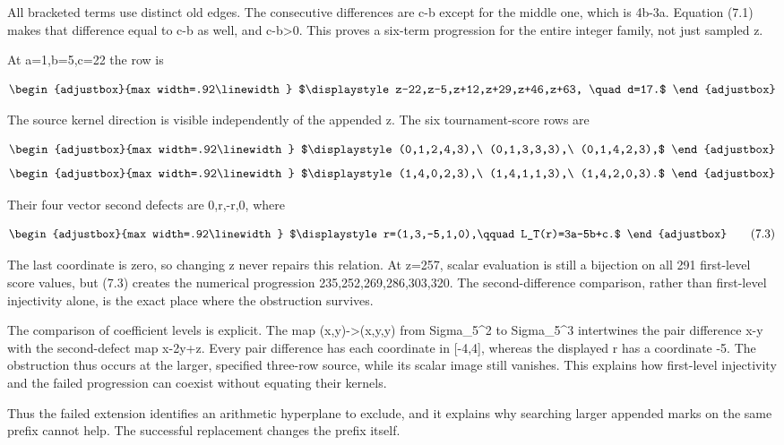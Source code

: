 All bracketed terms use distinct old edges. The consecutive differences are c-b except for the middle one, which is 4b-3a. Equation (7.1) makes that difference equal to c-b as well, and c-b\textgreater0. This proves a six-term progression for the entire integer family, not just sampled z.

At a=1,b=5,c=22 the row is

\[
\begin{adjustbox}{max width=.92\linewidth}
$\displaystyle z-22,z-5,z+12,z+29,z+46,z+63,
\quad d=17.$
\end{adjustbox}
\]

The source kernel direction is visible independently of the appended z. The six tournament-score rows are

\[
\begin{adjustbox}{max width=.92\linewidth}
$\displaystyle (0,1,2,4,3),\ (0,1,3,3,3),\ (0,1,4,2,3),$
\end{adjustbox}
\] \[
\begin{adjustbox}{max width=.92\linewidth}
$\displaystyle (1,4,0,2,3),\ (1,4,1,1,3),\ (1,4,2,0,3).$
\end{adjustbox}
\]

Their four vector second defects are 0,r,-r,0, where

\[
\begin{adjustbox}{max width=.92\linewidth}
$\displaystyle r=(1,3,-5,1,0),\qquad L_T(r)=3a-5b+c.$
\end{adjustbox}
\tag{7.3}
\]

The last coordinate is zero, so changing z never repairs this relation. At z=257, scalar evaluation is still a bijection on all 291 first-level score values, but (7.3) creates the numerical progression 235,252,269,286,303,320. The second-difference comparison, rather than first-level injectivity alone, is the exact place where the obstruction survives.

The comparison of coefficient levels is explicit. The map (x,y)-\textgreater(x,y,y) from Sigma\_5\^{}2 to Sigma\_5\^{}3 intertwines the pair difference x-y with the second-defect map x-2y+z. Every pair difference has each coordinate in {[}-4,4{]}, whereas the displayed r has a coordinate -5. The obstruction thus occurs at the larger, specified three-row source, while its scalar image still vanishes. This explains how first-level injectivity and the failed progression can coexist without equating their kernels.

Thus the failed extension identifies an arithmetic hyperplane to exclude, and it explains why searching larger appended marks on the same prefix cannot help. The successful replacement changes the prefix itself.

